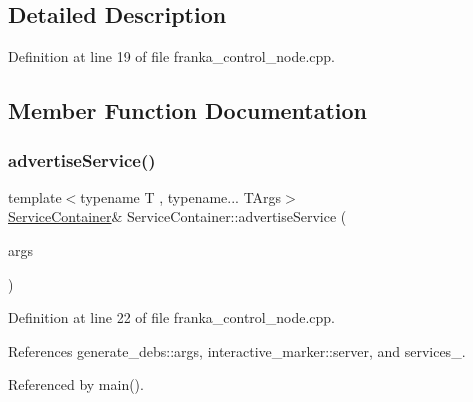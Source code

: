 \subsection{Detailed Description}


Definition at line 19 of file franka\+\_\+control\+\_\+node.\+cpp.



\subsection{Member Function Documentation}
\mbox{\label{classServiceContainer_a46e347a74b89b0001362544711b18862}} 
\subsubsection{\texorpdfstring{advertise\+Service()}{advertiseService()}}
{\footnotesize\ttfamily template$<$typename T , typename... T\+Args$>$ \\
\hyperlink{classServiceContainer}{Service\+Container}\& Service\+Container\+::advertise\+Service (\begin{DoxyParamCaption}\item[{T\+Args \&\&...}]{args }\end{DoxyParamCaption})\hspace{0.3cm}{\ttfamily [inline]}}



Definition at line 22 of file franka\+\_\+control\+\_\+node.\+cpp.



References generate\+\_\+debs\+::args, interactive\+\_\+marker\+::server, and services\+\_\+.



Referenced by main().


